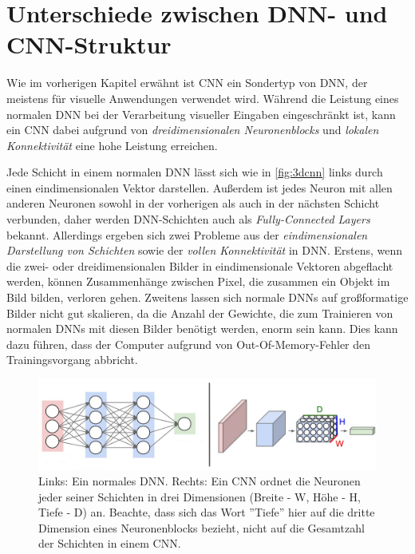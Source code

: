 \section{Unterschiede zwischen DNN- und CNN-Struktur}

Wie im vorherigen Kapitel erwähnt ist CNN ein Sondertyp von DNN, der meistens für visuelle Anwendungen verwendet wird. Während die Leistung eines normalen DNN bei der Verarbeitung visueller Eingaben eingeschränkt ist, kann ein CNN dabei aufgrund von \emph{dreidimensionalen Neuronenblocks} und \emph{lokalen Konnektivität} eine hohe Leistung erreichen. 

Jede Schicht in einem normalen DNN lässt sich wie in \autoref{fig:3dcnn} links durch einen eindimensionalen Vektor darstellen. Außerdem ist jedes Neuron mit allen anderen Neuronen sowohl in der vorherigen als auch in der nächsten Schicht verbunden, daher werden DNN-Schichten auch als \emph{Fully-Connected Layers} bekannt. Allerdings ergeben sich zwei Probleme aus der \emph{eindimensionalen Darstellung von Schichten} sowie der \emph{vollen Konnektivität} in DNN. Erstens, wenn die zwei- oder dreidimensionalen Bilder in eindimensionale Vektoren abgeflacht werden, können Zusammenhänge zwischen Pixel, die zusammen ein Objekt im Bild bilden, verloren gehen. Zweitens lassen sich normale DNNs auf großformatige Bilder nicht gut skalieren, da die Anzahl der Gewichte, die zum Trainieren von normalen DNNs mit diesen Bilder benötigt werden, enorm sein kann. Dies kann dazu führen, dass der Computer aufgrund von Out-Of-Memory-Fehler den Trainingsvorgang abbricht.

\begin{figure}[!hb]
	\centering
	\includegraphics[width=\linewidth]{images/3DCNN}
	\caption{Links: Ein normales DNN. Rechts: Ein CNN ordnet die Neuronen jeder seiner Schichten in drei Dimensionen (Breite - W, Höhe - H, Tiefe - D) an. Beachte, dass sich das Wort ''Tiefe'' hier auf die dritte Dimension eines Neuronenblocks bezieht, nicht auf die Gesamtzahl der Schichten in einem CNN.  \protect\cite{CS231nCNNarchitecture}}
	\label{fig:3dcnn}
\end{figure}

